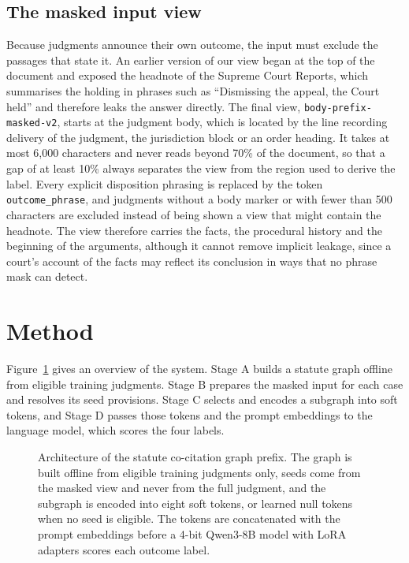 \documentclass[11pt,a4paper]{article}
\begin{document}
\subsection{The masked input view}
Because judgments announce their own outcome, the input must exclude the passages that state it. An earlier version of our view began at the top of the document and exposed the headnote of the Supreme Court Reports, which summarises the holding in phrases such as ``Dismissing the appeal, the Court held'' and therefore leaks the answer directly. The final view, \texttt{body-prefix-masked-v2}, starts at the judgment body, which is located by the line recording delivery of the judgment, the jurisdiction block or an order heading. It takes at most 6,000 characters and never reads beyond 70\% of the document, so that a gap of at least 10\% always separates the view from the region used to derive the label. Every explicit disposition phrasing is replaced by the token \texttt{outcome\_phrase}, and judgments without a body marker or with fewer than 500 characters are excluded instead of being shown a view that might contain the headnote. The view therefore carries the facts, the procedural history and the beginning of the arguments, although it cannot remove implicit leakage, since a court's account of the facts may reflect its conclusion in ways that no phrase mask can detect.

\section{Method}\label{sec:method}
Figure~\ref{fig:arch} gives an overview of the system. Stage A builds a statute graph offline from eligible training judgments. Stage B prepares the masked input for each case and resolves its seed provisions. Stage C selects and encodes a subgraph into soft tokens, and Stage D passes those tokens and the prompt embeddings to the language model, which scores the four labels.

\begin{figure}[t]\centering\resizebox{\linewidth}{!}{}
\caption{Architecture of the statute co-citation graph prefix. The graph is built offline from eligible training judgments only, seeds come from the masked view and never from the full judgment, and the subgraph is encoded into eight soft tokens, or learned null tokens when no seed is eligible. The tokens are concatenated with the prompt embeddings before a 4-bit Qwen3-8B model with LoRA adapters scores each outcome label.}\label{fig:arch}\end{figure}
\end{document}

